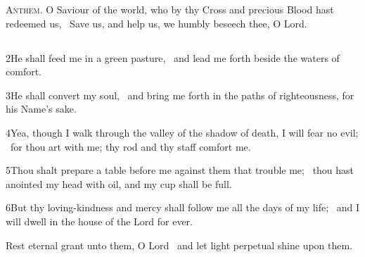 
{\red\scshape Anthem.} O Saviour of the world, who by thy Cross and precious Blood hast redeemed us, \star\ Save us, and help us, we humbly beseech thee, O Lord.




\subsection[{Psalm 23}]{}

2\enspace He shall feed me in a green pasture, \star\ and lead me forth beside the waters of comfort.

3\enspace He shall convert my soul, \star\ and bring me forth in the paths of righteousness, for his Name’s sake.

4\enspace Yea, though I walk through the valley of the shadow of death, I will fear no evil; \star\ for thou art with me; thy rod and thy staff comfort me.

5\enspace Thou shalt prepare a table before me against them that trouble me; \star\ thou hast anointed my head with oil, and my cup shall be full.

6\enspace But thy loving-kindness and mercy shall follow me all the days of my life; \star\ and I will dwell in the house of the Lord for ever.

Rest eternal grant unto them, O Lord \star\ and let light perpetual shine upon them.


\subsection[{Psalm 39}]{}

